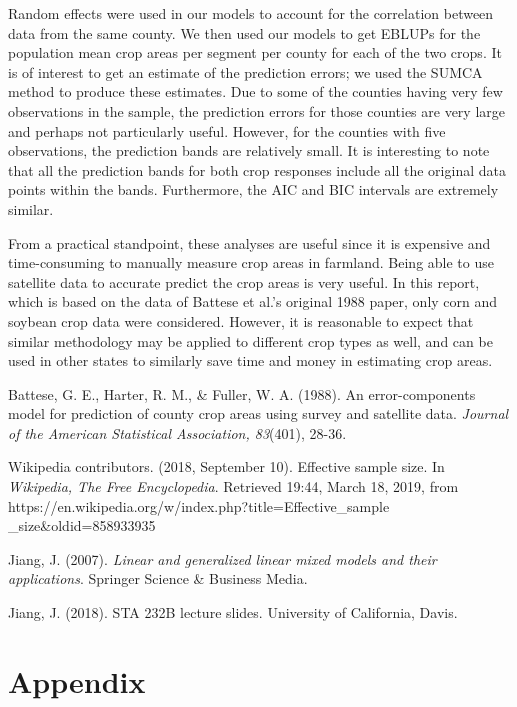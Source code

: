 \documentclass{article}
\begin{document}
Random effects were used in our models to account for the correlation between data from the same county. We then used our models to get EBLUPs for the population mean crop areas per segment per county for each of the two crops. It is of interest to get an estimate of the prediction errors; we used the SUMCA method to produce these estimates. Due to some of the counties having very few observations in the sample, the prediction errors for those counties are very large and perhaps not particularly useful. However, for the counties with five observations, the prediction bands are relatively small. It is interesting to note that all the prediction bands for both crop responses include all the original data points within the bands. Furthermore, the AIC and BIC intervals are extremely similar.
\medbreak

From a practical standpoint, these analyses are useful since it is expensive and time-consuming to manually measure crop areas in farmland. Being able to use satellite data to accurate predict the crop areas is very useful. In this report, which is based on the data of Battese et al.'s original 1988 paper, only corn and soybean crop data were considered. However, it is reasonable to expect that similar methodology may be applied to different crop types as well, and can be used in other states to similarly save time and money in estimating crop areas.

\begin{thebibliography}{1}
	 Battese, G. E., Harter, R. M., \& Fuller, W. A. (1988). An error-components model for prediction of county crop areas using survey and satellite data. \textit{Journal of the American Statistical Association, 83}(401), 28-36.
	
	 Wikipedia contributors. (2018, September 10). Effective sample size. In \textit{Wikipedia, The Free Encyclopedia}. Retrieved 19:44, March 18, 2019, from https://en.wikipedia.org/w/index.php?title=Effective\_sample \_size\&oldid=858933935
	
	 Jiang, J. (2007). \textit{Linear and generalized linear mixed models and their applications}. Springer Science \& Business Media.
	
	 Jiang, J. (2018). STA 232B lecture slides. University of California, Davis.
	
\end{thebibliography}


\newpage
\section{Appendix}
\end{document}
